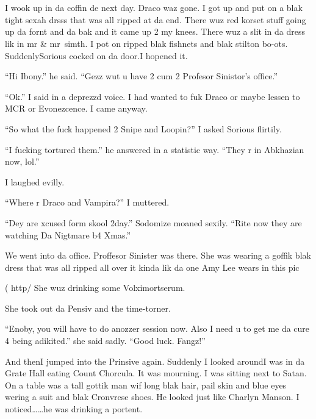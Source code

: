 \section{}



I wook up in da coffin de next day. Draco waz gone. I got up and put on a blak tight sexah drsss that was all ripped at da end. There wuz red korset stuff going up da fornt and da bak and it came up 2 my knees. There wuz a slit in da dress lik in mr \& mr~simth. I pot on ripped blak fishnets and blak stilton bo-ots. Suddenly\dotfill Sorious cocked on da door.\newline I hopened it.

\enquote{Hi Ibony.} he said. \enquote{Gezz wut u have 2 cum 2 Profesor Sinistor's office.}

\enquote{Ok.} I said in a deprezzd voice. I had wanted to fuk Draco or maybe lessen to MCR or Evonezcence. I came anyway.

\enquote{So what the fuck happened 2 Snipe and Loopin?} I asked Sorious flirtily.

\enquote{I fucking tortured them.} he answered in a statistic way. \enquote{They r in Abkhazian now, lol.}

I laughed evilly.

\enquote{Where r Draco and Vampira?} I muttered.

\enquote{Dey are xcused form skool 2day.} Sodomize moaned sexily. \enquote{Rite now they are watching Da Nigtmare b4 Xmas.}

We went into da office. Proffesor Sinister was there. She was wearing a goffik blak dress that was all ripped all over it kinda lik da one Amy Lee wears in this pic

( http/ She wuz drinking some Volximortserum.

She took out da Pensiv and the time-torner.

\enquote{Enoby, you will have to do anozzer session now. Also I need u to get me da cure 4 being adikited.} she said sadly. \enquote{Good luck. Fangz!}

And then\dotfill I jumped into the Prinsive again.\newline
Suddenly I looked around\dotfill I was in da Grate Hall\newline
eating Count Chorcula. It was mourning. I was sitting next to Satan. On a table was a tall gottik man wif long blak hair, pail skin and blue eyes wering a suit and blak Cronvrese shoes. He looked just like Charlyn Manson. I noticed\ldots\ldots he was drinking a portent.

